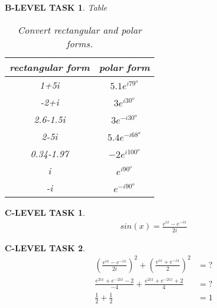 \documentclass{book}
\numberwithin{equation}{section}
\newtheorem{blevel}{B-LEVEL TASK}
\newtheorem{clevel}{C-LEVEL TASK}
\theoremstyle{definition}
\begin{document}
\begin{blevel} Table\par
\begin{table}[H]
\begin{center}
\begin{tabular}{|c|c|} \hline
rectangular form	&polar form\\ \hline
1+5i & $5.1e^{i79^o}$\\ \hline
-2+i& $3e^{i30^o}$\\ \hline
2.6-1.5i& $3e^{-i30^o}$\\ \hline
2-5i& $5.4e^{-i68^o}$ \\\hline
0.34-1.97& $-2e^{i100^o}$\\ \hline
i& $e^{i90^o}$\\ \hline
-i& $e^{-i90^o}$\\ \hline
\end{tabular}
\caption{Convert rectangular and polar forms.}
\label{T:convert}
\end{center}
\end{table}
\end{blevel}

\begin{clevel}
\begin{align*}
sin(x)=\frac{e^{ix}-e^{-ix}}{2i}
\end{align*}
\end{clevel}

\begin{clevel}
\begin{align*}
(\frac{e^{ix}-e^{-ix}}{2i})^2+(\frac{e^{ix}+e^{-ix}}{2})^2&=?\\
\frac{e^{2ix}+e^{-2ix}-2}{-4}+\frac{e^{2ix}+e^{-2ix}+2}{4}&=?\\
\frac{1}{2}+\frac{1}{2}&=1
\end{align*}
\end{clevel}
\end{document}
